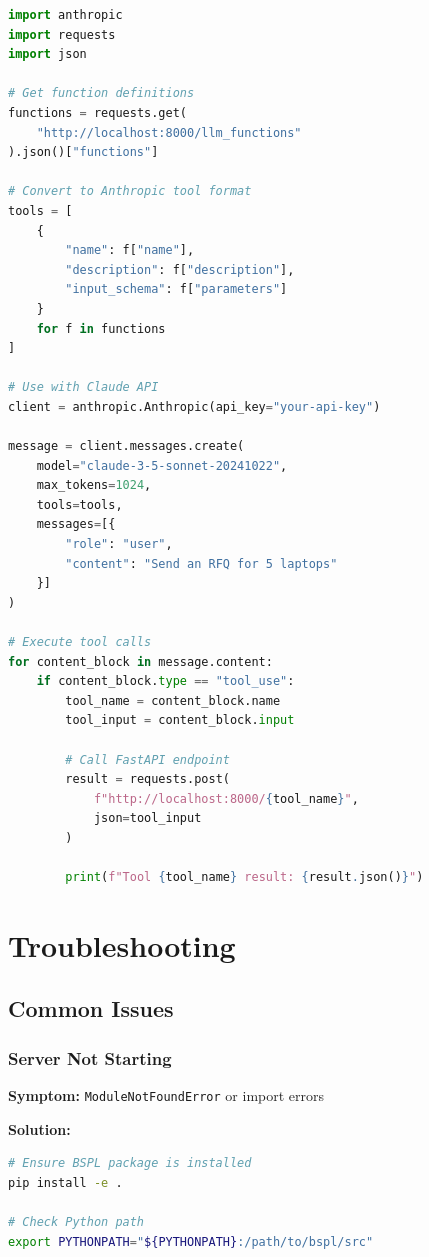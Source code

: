\documentclass[11pt,a4paper]{article}
\begin{document}
\begin{lstlisting}[language=Python]
import anthropic
import requests
import json

# Get function definitions
functions = requests.get(
    "http://localhost:8000/llm_functions"
).json()["functions"]

# Convert to Anthropic tool format
tools = [
    {
        "name": f["name"],
        "description": f["description"],
        "input_schema": f["parameters"]
    }
    for f in functions
]

# Use with Claude API
client = anthropic.Anthropic(api_key="your-api-key")

message = client.messages.create(
    model="claude-3-5-sonnet-20241022",
    max_tokens=1024,
    tools=tools,
    messages=[{
        "role": "user",
        "content": "Send an RFQ for 5 laptops"
    }]
)

# Execute tool calls
for content_block in message.content:
    if content_block.type == "tool_use":
        tool_name = content_block.name
        tool_input = content_block.input
        
        # Call FastAPI endpoint
        result = requests.post(
            f"http://localhost:8000/{tool_name}",
            json=tool_input
        )
        
        print(f"Tool {tool_name} result: {result.json()}")
\end{lstlisting}

\section{Troubleshooting}

\subsection{Common Issues}

\subsubsection{Server Not Starting}

\textbf{Symptom:} \texttt{ModuleNotFoundError} or import errors

\textbf{Solution:}
\begin{lstlisting}[language=bash]
# Ensure BSPL package is installed
pip install -e .

# Check Python path
export PYTHONPATH="${PYTHONPATH}:/path/to/bspl/src"
\end{lstlisting}
\end{document}
